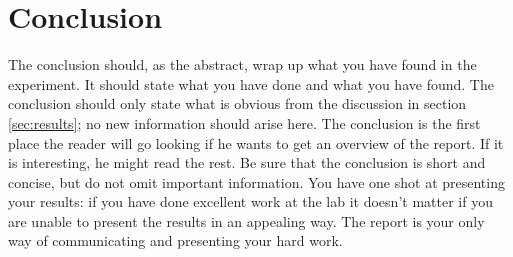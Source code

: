 \section{Conclusion}
\label{sec:conclusion}
The conclusion should, as the abstract, wrap up what you have found in the experiment. It should state what you have done and what you have found. The conclusion should only state what is obvious from the discussion in section \ref{sec:results}; no new information should arise here. The conclusion is the first place the reader will go looking if he wants to get an overview of the report. If it is interesting, he might read the rest. Be sure that the conclusion is short and concise, but do not omit important information. You have one shot at presenting your results: if you have done excellent work at the lab it doesn't matter if you are unable to present the results in an appealing way. The report is your only way of communicating and presenting your hard work.